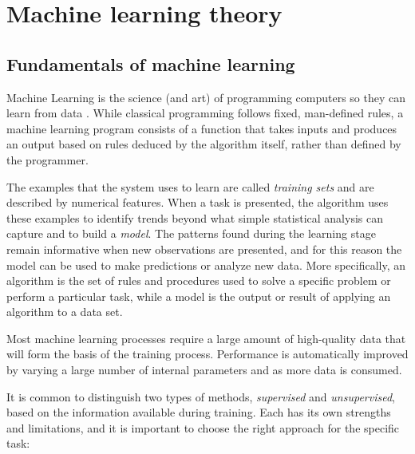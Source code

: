 

\chapter{Machine learning theory}
\label{ch:ml_theory}

\section{Fundamentals of machine learning}
\label{sec:introduction_to_ml}

Machine Learning is the science (and art) of programming computers so they can
learn from data \cite{geron2022hands}.
While classical programming follows fixed, man-defined rules, a machine learning program consists of a function that takes inputs and produces an output based on rules deduced by the algorithm itself, rather than defined by the programmer. 

The examples that the system uses to learn are called \textit{training sets} and are described by numerical features. When a task is presented, the algorithm uses these examples to identify trends beyond what simple statistical analysis can capture and to build a \textit{model}. The patterns found during the learning stage remain informative when new observations are presented, and for this reason the model can be used to make predictions or analyze new data. More specifically, an algorithm is the set of rules and procedures used to solve a specific problem or perform a particular task, while a model is the output or result of applying an algorithm to a data set.

Most machine learning processes require a large amount of high-quality data that will form the basis of the training process.
Performance is automatically improved by varying a large number of internal parameters and as more data is consumed. 

It is common to distinguish two types of methods, \textit{supervised} and \textit{unsupervised}, based on the information available during training. Each has its own strengths and limitations, and it is important to choose the right approach for the specific task:

